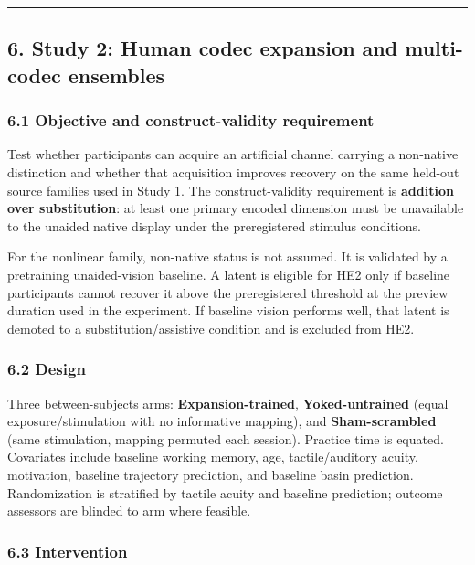 \documentclass[
  11pt,
]{article}
\begin{document}
\begin{center}\rule{0.5\linewidth}{0.5pt}\end{center}

\subsection{6. Study 2: Human codec expansion and
multi-codec
ensembles}\label{study-2-human-codec-expansion-and-multi-codec-ensembles}

\subsubsection{6.1 Objective and construct-validity
requirement}\label{objective-and-construct-validity-requirement}

Test whether participants can acquire an artificial
channel carrying a non-native distinction and whether
that acquisition improves recovery on the same held-out
source families used in Study 1. The construct-validity
requirement is \textbf{addition over substitution}: at
least one primary encoded dimension must be unavailable
to the unaided native display under the preregistered
stimulus conditions.

For the nonlinear family, non-native status is not
assumed. It is validated by a pretraining
unaided-vision baseline. A latent is eligible for HE2
only if baseline participants cannot recover it above
the preregistered threshold at the preview duration
used in the experiment. If baseline vision performs
well, that latent is demoted to a
substitution/assistive condition and is excluded from
HE2.

\subsubsection{6.2 Design}\label{design}

Three between-subjects arms:
\textbf{Expansion-trained}, \textbf{Yoked-untrained}
(equal exposure/stimulation with no informative
mapping), and \textbf{Sham-scrambled} (same
stimulation, mapping permuted each session). Practice
time is equated. Covariates include baseline working
memory, age, tactile/auditory acuity, motivation,
baseline trajectory prediction, and baseline basin
prediction. Randomization is stratified by tactile
acuity and baseline prediction; outcome assessors are
blinded to arm where feasible.

\subsubsection{6.3 Intervention}\label{intervention}
\end{document}
